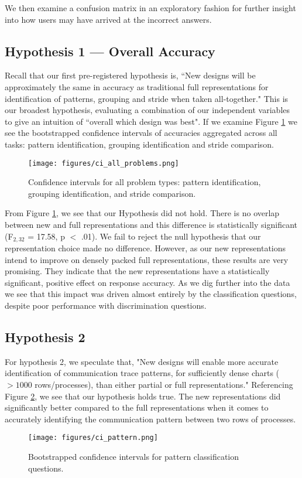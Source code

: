     We then examine a confusion matrix in an exploratory fashion for further insight into how users may have arrived at the incorrect answers.
    
    
\subsection{Hypothesis 1 --- Overall Accuracy}
    Recall that our first pre-registered hypothesis is, ``New designs will be approximately the same in accuracy as traditional full representations for identification of patterns, grouping and stride when taken all-together." This is our broadest hypothesis, evaluating a combination of our independent variables to give an intuition of ``overall which design was best". If we examine Figure \ref{fig:ci_all_prob} we see the bootstrapped confidence intervals of accuracies aggregated across all tasks: pattern identification, grouping identification and stride comparison.
    
    \begin{figure}
        \centering
        \texttt{[image: figures/ci\_all\_problems.png]}
        \caption{Confidence intervals for all problem types: pattern identification, grouping identification, and stride comparison.}
        \label{fig:ci_all_prob}
    \end{figure}
    
    From Figure \ref{fig:ci_all_prob}, we see that our Hypothesis did not hold. There is no overlap between new and full representations and this difference is statistically significant (F$_{2,32}$ = 17.58, p $<$ .01). We fail to reject the null hypothesis that our representation choice made no difference. However, as our new representations intend to improve on densely packed full representations, these results are very promising. They indicate that the new representations have a statistically significant, positive effect on response accuracy. As we dig further into the data we see that this impact was driven almost entirely by the classification questions, despite poor performance with discrimination questions.

\subsection{Hypothesis 2}
    For hypothesis 2, we speculate that, "New designs will enable more accurate identification of communication trace patterns, for sufficiently dense charts ($>1000$ rows/processes), than either partial or full representations." Referencing Figure \ref{fig:ci_pattern}, we see that our hypothesis holds true. The new representations did significantly better compared to the full representations when it comes to accurately identifying the communication pattern between two rows of processes. 
    \begin{figure}
        \centering
        \texttt{[image: figures/ci\_pattern.png]}
        \caption{Bootstrapped confidence intervals for pattern classification questions.}
        \label{fig:ci_pattern}
    \end{figure}
    
